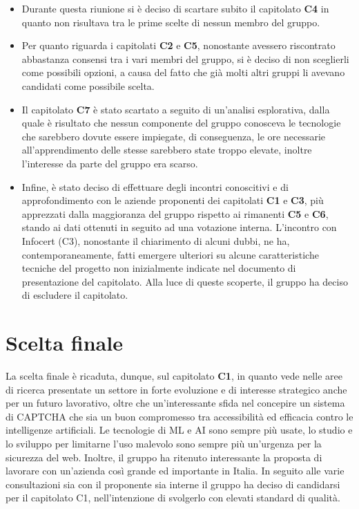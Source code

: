 \documentclass{article}
\begin{document}
\begin{itemize}
    
    \item 
    Durante questa riunione si è deciso di scartare subito il capitolato \textbf{C4} in quanto non risultava tra le prime scelte di nessun membro del gruppo.
    \item
    Per quanto riguarda i capitolati \textbf{C2} e \textbf{C5}, nonostante avessero riscontrato abbastanza consensi tra i vari membri del gruppo, si è deciso di non sceglierli come possibili opzioni,  a causa del fatto che già molti altri gruppi li avevano candidati come possibile scelta.
    \item
    Il capitolato \textbf{C7} è stato scartato a seguito di un’analisi esplorativa, dalla quale è risultato che nessun componente del gruppo conosceva le tecnologie che sarebbero dovute essere impiegate, di conseguenza, le ore necessarie all'apprendimento delle stesse sarebbero state troppo elevate, inoltre l'interesse da parte del gruppo era scarso.
    \item 
    Infine, è stato deciso di effettuare degli incontri conoscitivi e di approfondimento con le aziende proponenti dei capitolati \textbf{C1} e \textbf{C3},  più apprezzati dalla maggioranza del gruppo rispetto ai rimanenti \textbf{C5} e \textbf{C6}, stando ai dati ottenuti in seguito ad una votazione interna.
    L’incontro con Infocert (C3), nonostante il chiarimento di alcuni dubbi, ne ha, contemporaneamente, fatti emergere ulteriori su alcune caratteristiche tecniche del progetto non inizialmente indicate nel documento di presentazione del capitolato. Alla luce di queste scoperte, il gruppo ha deciso di escludere il capitolato.
    
\end{itemize}

\section{Scelta finale}

La scelta finale è ricaduta, dunque, sul capitolato \textbf{C1}, in quanto vede nelle aree di ricerca presentate un settore in forte evoluzione e di interesse strategico anche per un futuro lavorativo, oltre che un'interessante sfida nel concepire un sistema di CAPTCHA che sia un buon compromesso tra accessibilità ed efficacia contro le intelligenze artificiali. Le tecnologie di ML e AI sono sempre più usate, lo studio e lo sviluppo per limitarne l'uso malevolo sono sempre più un’urgenza per la sicurezza del web. Inoltre, il gruppo ha ritenuto interessante la proposta di lavorare con un’azienda così grande ed importante in Italia.
In seguito alle varie consultazioni sia con il proponente sia interne il gruppo ha deciso di candidarsi per il capitolato C1, nell’intenzione di svolgerlo con elevati standard di qualità.
\end{document}
